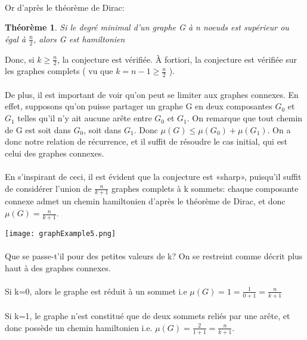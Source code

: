 \documentclass[a4paper]{article}
\newtheorem{theorem}{Théorème}
\theoremstyle{definition}
\theoremstyle{remark}
\begin{document}
\paragraph{}
Or d'après le théorème de Dirac:
\begin{theorem}
Si le degré minimal d'un graphe G à n noeuds est supérieur ou égal à
$\frac{n}{2}$, alors G est hamiltonien
\end{theorem}


Donc, si $k \geq \frac{n}{2}$, la conjecture est vérifiée. À fortiori, la
conjecture est vérifiée sur les graphes complets ( vu que $k = n-1 \geq \frac{n}{2}$ ).


\paragraph{}
De plus, il est important de voir qu'on peut se limiter aux graphes connexes. En effet, supposons qu'on puisse partager un graphe G en deux composantes
$G_{0}$ et $G_{1}$ telles qu'il n'y ait aucune arête entre $G_{0}$ et $G_{1}$. On remarque que tout chemin de G est soit dans $G_{0}$, soit dans $G_{1}$.
Donc $\mu(G) \leq \mu(G_{0}) + \mu(G_{1})$. On a donc notre relation de
récurrence, et il suffit de résoudre le cas initial, qui est celui des graphes connexes.


\paragraph{}
En s'inspirant de ceci, il est évident que la conjecture est «sharp», puisqu'il suffit de considérer l'union de $\frac{n}{k+1}$ graphes complets à k sommets: chaque composante connexe admet un chemin 
hamiltonien d'après le théorème de Dirac, et donc $\mu(G)=\frac{n}{k+1}$.


\texttt{[image: graphExample5.png]}


\paragraph{}
Que se passe-t'il pour des petites valeurs de k? On se restreint comme décrit plus haut à des graphes connexes.


\paragraph{}
Si k=0, alors le graphe est réduit à un sommet i.e $\mu(G)=1=\frac{1}{0+1}=\frac{n}{k+1}$


\paragraph{}
Si k=1, le graphe n'est constitué que de deux sommets reliés par une arête, et donc possède un chemin hamiltonien i.e. $\mu(G)=\frac{2}{1+1}=\frac{n}{k+1}$.
\end{document}
